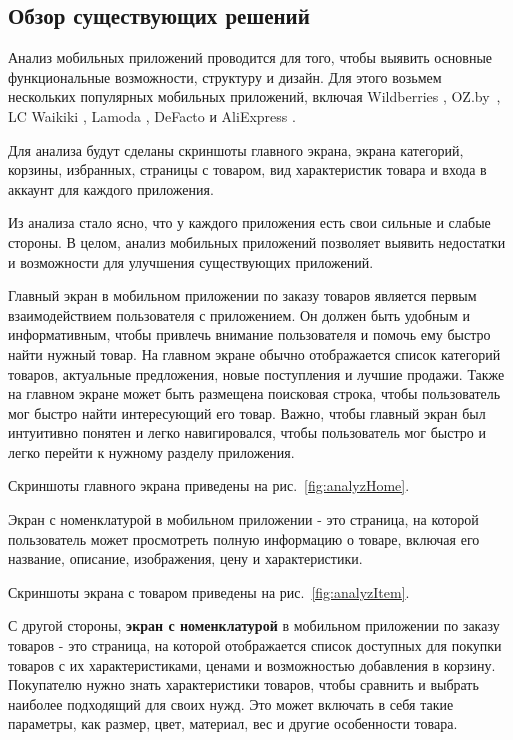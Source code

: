 \subsection{Обзор существующих решений}

Анализ мобильных приложений проводится для того, чтобы выявить основные функциональные возможности, структуру и дизайн.
Для этого возьмем нескольких популярных мобильных приложений, включая
Wildberries \cite{AndroidWildberries},
OZ.by~\cite{AndroidOzBy},
LC Waikiki \cite{AndroidLcWaikiki},
Lamoda \cite{AndroidLamoda},
DeFacto \cite{AndroidDefacto}
и AliExpress \cite{AndroidAliExpress}.

Для анализа будут сделаны скриншоты главного экрана, экрана категорий, корзины, избранных, страницы с товаром, вид характеристик товара и входа в аккаунт
для каждого приложения.

Из анализа стало ясно, что у каждого приложения есть свои сильные и слабые стороны.
В целом, анализ мобильных приложений позволяет выявить недостатки и возможности для улучшения существующих приложений.

Главный экран в мобильном приложении по заказу товаров является первым взаимодействием пользователя с приложением.
Он должен быть удобным и информативным, чтобы привлечь внимание пользователя и помочь ему быстро найти нужный товар.
На главном экране обычно отображается список категорий товаров, актуальные предложения, новые поступления и лучшие продажи.
Также на главном экране может быть размещена поисковая строка, чтобы пользователь мог быстро найти интересующий его товар.
Важно, чтобы главный экран был интуитивно понятен и легко навигировался, чтобы пользователь мог быстро и легко перейти к нужному разделу приложения.

Скриншоты главного экрана приведены на рис.~\ref{fig:analyzHome}.

Экран с номенклатурой в мобильном приложении - это страница, на которой пользователь может просмотреть полную информацию о товаре,
включая его название, описание, изображения, цену и характеристики.

Скриншоты экрана с товаром приведены на рис.~\ref{fig:analyzItem}.

С другой стороны, \textbf{экран с номенклатурой} в мобильном приложении по заказу товаров - это страница,
на которой отображается список доступных для покупки товаров с их характеристиками,
ценами и возможностью добавления в корзину.
Покупателю нужно знать характеристики товаров,
чтобы сравнить и выбрать наиболее подходящий для своих нужд.
Это может включать в себя такие параметры, как размер, цвет, материал, вес и другие особенности товара.

